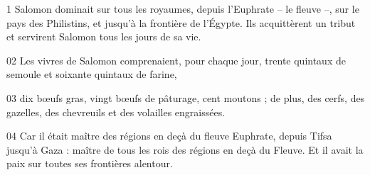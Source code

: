 1 Salomon dominait sur tous les royaumes, depuis l’Euphrate – le fleuve –, sur le pays des Philistins, et jusqu’à la frontière de l’Égypte. Ils acquittèrent un tribut et servirent Salomon tous les jours de sa vie.

02 Les vivres de Salomon comprenaient, pour chaque jour, trente quintaux de semoule et soixante quintaux de farine,

03 dix bœufs gras, vingt bœufs de pâturage, cent moutons ; de plus, des cerfs, des gazelles, des chevreuils et des volailles engraissées.

04 Car il était maître des régions en deçà du fleuve Euphrate, depuis Tifsa jusqu’à Gaza : maître de tous les rois des régions en deçà du Fleuve. Et il avait la paix sur toutes ses frontières alentour.
